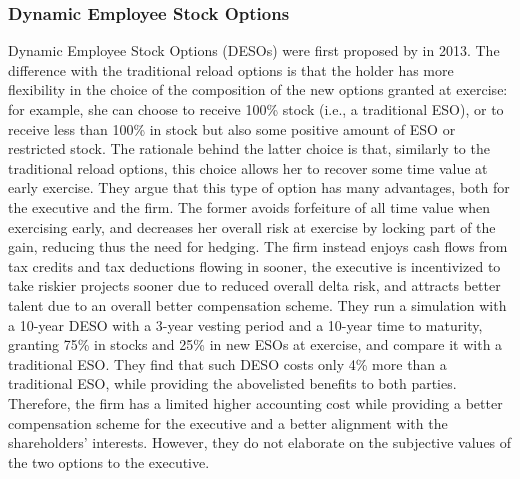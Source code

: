 \subsubsection{Dynamic Employee Stock Options}
    Dynamic Employee Stock Options (DESOs) were first proposed by \cite{huang2013dynamic} in 2013.  The difference with the traditional reload options is that the holder has more flexibility in the choice of the composition of the new options granted at exercise: for example, she can choose to receive 100\% stock (i.e., a traditional ESO), or to receive less than 100\% in stock but also some positive amount of ESO or restricted stock. The rationale behind the latter choice is that, similarly to the traditional reload options, this choice allows her to recover some time value at early exercise. They argue that this type of option has many advantages, both for the executive and the firm. The former avoids forfeiture of all time value when exercising early, and decreases her overall risk at exercise by locking part of the gain, reducing thus the need for hedging. The firm instead enjoys cash flows from tax credits and tax deductions flowing in sooner, the executive is incentivized to take riskier projects sooner due to reduced overall delta risk, and attracts better talent due to an overall better compensation scheme. 
    They run a simulation with a 10-year DESO with a 3-year vesting period and a 10-year time to maturity, granting 75\% in stocks and 25\% in new ESOs at exercise, and compare it with a traditional ESO. They find that such DESO costs only 4\% more than a traditional ESO, while providing the abovelisted benefits to both parties. Therefore, the firm has a limited higher accounting cost while providing a better compensation scheme for the executive and a better alignment with the shareholders' interests. However, they do not elaborate on the subjective values of the two options to the executive.

